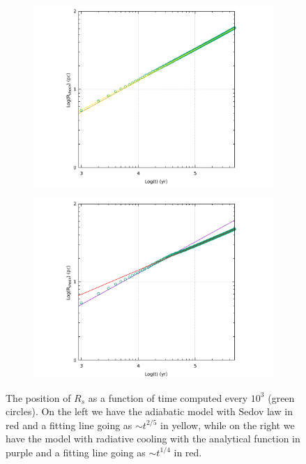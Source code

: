 \documentclass{article}
\begin{document}
\begin{figure}[H]
	\begin{subfigure}{0.5 \linewidth}
		\centering
		\includegraphics[width=1 \linewidth]{sedov.pdf}
	\end{subfigure}
	\begin{subfigure}{0.5 \linewidth}
		\centering
		\includegraphics[width=1 \linewidth]{sedovcool.pdf}
	\end{subfigure}
	\caption{The position of $R_s$ as a function of time computed every $10^3$ (green circles). On the left we have the adiabatic model with Sedov law in red and a fitting line going as $\sim t^{2/5}$ in yellow, while on the right we have the model with radiative cooling with the analytical function in purple and a fitting line going as $\sim t^{1/4}$ in red.}

	\label{fig:sedov}
\end{figure}
\end{document}
